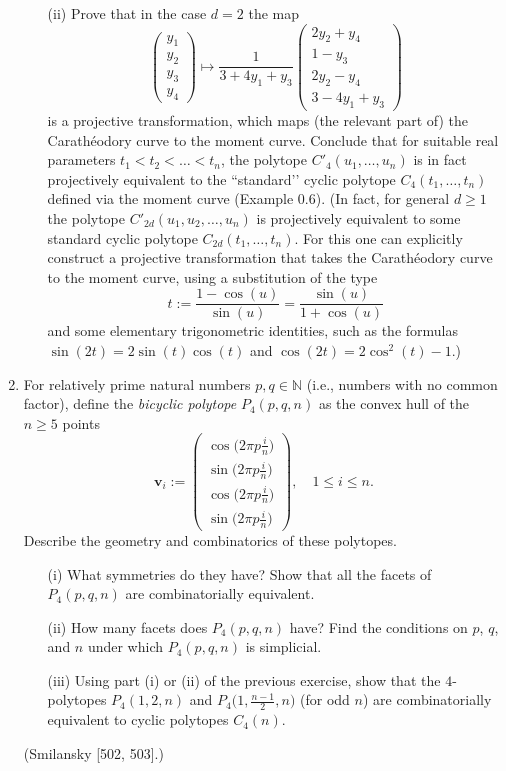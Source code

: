 \documentclass{article}
\begin{document}
\begin{enumerate}
\begin{enumerate}
\item[(ii)] Prove that in the case $d = 2$ the map
\[
  \begin{pmatrix}
    y_1\\ y_2\\ y_3\\ y_4
  \end{pmatrix}
  \longmapsto
  \frac{1}{3 + 4y_1 + y_3}
  \begin{pmatrix}
    2y_2 + y_4\\ 1 - y_3\\ 2y_2 - y_4\\ 3 - 4y_1 + y_3
  \end{pmatrix}
\]
is a projective transformation, which maps (the relevant part of) the Carathéodory curve to the moment curve. Conclude that for suitable real parameters $t_1 < t_2 < \dots < t_n$, the polytope $C'_4(u_1,\dots,u_n)$ is in fact projectively equivalent to the “standard’’ cyclic polytope $C_4(t_1,\dots,t_n)$ defined via the moment curve (Example 0.6).
(In fact, for general $d \ge 1$ the polytope $C'_{2d}(u_1,u_2,\dots,u_n)$ is projectively equivalent to some standard cyclic polytope $C_{2d}(t_1,\dots,t_n)$. For this one can explicitly construct a projective transformation that takes the Carathéodory curve to the moment curve, using a substitution of the type
\[
  t := \frac{1-\cos(u)}{\sin(u)} = \frac{\sin(u)}{1+\cos(u)}
\]
and some elementary trigonometric identities, such as the formulas $\sin(2t) = 2\sin(t)\cos(t)$ and $\cos(2t) = 2\cos^2(t)-1$.)
\end{enumerate}

\item For relatively prime natural numbers $p,q \in \mathbb{N}$ (i.e., numbers with no common factor), define the \emph{bicyclic polytope} $P_4(p,q,n)$ as the convex hull of the $n \ge 5$ points
\[
  \mathbf{v}_i :=
  \begin{pmatrix}
    \cos\bigl(2\pi p\frac{ i}{n}\bigr)\\
    \sin\bigl(2\pi p\frac{ i}{n}\bigr)\\
    \cos\bigl(2\pi p\frac{i}{n}\bigr)\\
    \sin\bigl(2\pi p\frac{i}{n}\bigr)
  \end{pmatrix},
  \quad 1 \le i \le n.
\]
Describe the geometry and combinatorics of these polytopes.
\begin{enumerate}
\item[(i)] What symmetries do they have? Show that all the facets of $P_4(p,q,n)$ are combinatorially equivalent.
\item[(ii)] How many facets does $P_4(p,q,n)$ have? Find the conditions on $p$, $q$, and $n$ under which $P_4(p,q,n)$ is simplicial.
\item[(iii)] Using part (i) or (ii) of the previous exercise, show that the $4$-polytopes $P_4(1,2,n)$ and $P_4\bigl(1,\frac{n-1}{2},n\bigr)$ (for odd $n$) are combinatorially equivalent to cyclic polytopes $C_4(n)$.
\end{enumerate}
(Smilansky [502, 503].)


\end{enumerate}
\end{document}
